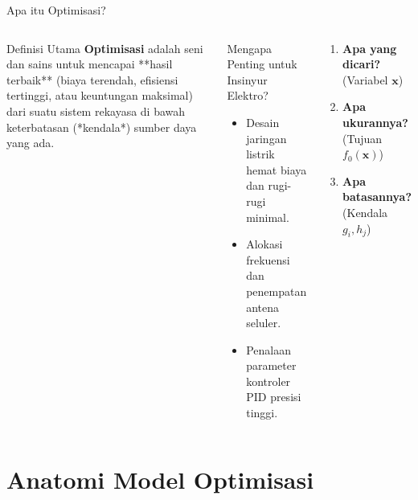 \documentclass[10pt,aspectratio=169]{beamer}
\begin{document}
\begin{frame}{Apa itu Optimisasi?}
    \begin{columns}
        \begin{block}{Definisi Utama}
            \textbf{Optimisasi} adalah seni dan sains untuk mencapai **hasil terbaik** (biaya terendah, efisiensi tertinggi, atau keuntungan maksimal) dari suatu sistem rekayasa di bawah keterbatasan (*kendala*) sumber daya yang ada.
        \end{block}

        \vspace{0.2cm}
        \begin{alertblock}{Mengapa Penting untuk Insinyur Elektro?}
          \begin{itemize}
              \item Desain jaringan listrik hemat biaya dan rugi-rugi minimal.
              \item Alokasi frekuensi dan penempatan antena seluler.
              \item Penalaan parameter kontroler PID presisi tinggi.
          \end{itemize}
        \end{alertblock}

        \begin{tcolorbox}[colback=unibgold!10,colframe=unibgold!80!black,title=\textbf{3 Elemen Kunci}]
            \begin{enumerate}
                \item \textbf{Apa yang dicari?} (Variabel $\mathbf{x}$)
                \item \textbf{Apa ukurannya?} (Tujuan $f_0(\mathbf{x})$)
                \item \textbf{Apa batasannya?} (Kendala $g_i, h_j$)
            \end{enumerate}
        \end{tcolorbox}
    \end{columns}
\end{frame}

\section{Anatomi Model Optimisasi}
\end{document}
